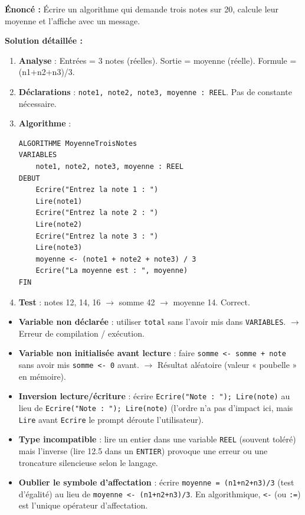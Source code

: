 \documentclass[11pt]{article}
\begin{document}
\begin{exoresolu}
\textbf{Énoncé :} Écrire un algorithme qui demande trois notes sur 20, calcule leur moyenne et l'affiche avec un message.

\textbf{Solution détaillée :}
\begin{enumerate}
    \item \textbf{Analyse} : Entrées = 3 notes (réelles). Sortie = moyenne (réelle). Formule = (n1+n2+n3)/3.
    \item \textbf{Déclarations} : \texttt{note1, note2, note3, moyenne : REEL}. Pas de constante nécessaire.
    \item \textbf{Algorithme} :
\begin{lstlisting}
ALGORITHME MoyenneTroisNotes
VARIABLES
    note1, note2, note3, moyenne : REEL
DEBUT
    Ecrire("Entrez la note 1 : ")
    Lire(note1)
    Ecrire("Entrez la note 2 : ")
    Lire(note2)
    Ecrire("Entrez la note 3 : ")
    Lire(note3)
    moyenne <- (note1 + note2 + note3) / 3
    Ecrire("La moyenne est : ", moyenne)
FIN
\end{lstlisting}
    \item \textbf{Test} : notes 12, 14, 16 $\rightarrow$ somme 42 $\rightarrow$ moyenne 14. Correct.
\end{enumerate}
\end{exoresolu}

\begin{attention}
\begin{itemize}
    \item \textbf{Variable non déclarée} : utiliser \texttt{total} sans l'avoir mis dans \texttt{VARIABLES}. $\rightarrow$ Erreur de compilation / exécution.
    \item \textbf{Variable non initialisée avant lecture} : faire \texttt{somme <- somme + note} sans avoir mis \texttt{somme <- 0} avant. $\rightarrow$ Résultat aléatoire (valeur « poubelle » en mémoire).
    \item \textbf{Inversion lecture/écriture} : écrire \texttt{Ecrire("Note : "); Lire(note)} au lieu de \texttt{Ecrire("Note : "); Lire(note)} (l'ordre n'a pas d'impact ici, mais \texttt{Lire} avant \texttt{Ecrire} le prompt déroute l'utilisateur).
    \item \textbf{Type incompatible} : lire un entier dans une variable \texttt{REEL} (souvent toléré) mais l'inverse (lire 12.5 dans un \texttt{ENTIER}) provoque une erreur ou une troncature silencieuse selon le langage.
    \item \textbf{Oublier le symbole d'affectation} : écrire \texttt{moyenne = (n1+n2+n3)/3} (test d'égalité) au lieu de \texttt{moyenne <- (n1+n2+n3)/3}. En algorithmique, \texttt{<-} (ou \texttt{:=}) est l'unique opérateur d'affectation.
\end{itemize}
\end{attention}
\end{document}
